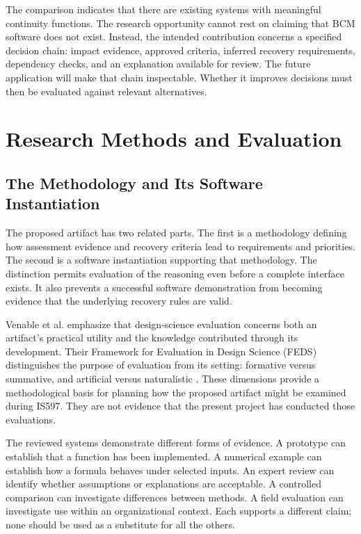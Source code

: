The comparison indicates that there are existing systems with meaningful continuity functions. The research opportunity cannot rest on claiming that BCM software does not exist. Instead, the intended contribution concerns a specified decision chain: impact evidence, approved criteria, inferred recovery requirements, dependency checks, and an explanation available for review. The future application will make that chain inspectable. Whether it improves decisions must then be evaluated against relevant alternatives.

\section{Research Methods and Evaluation}

\subsection{The Methodology and Its Software Instantiation}

The proposed artifact has two related parts. The first is a methodology defining how assessment evidence and recovery criteria lead to requirements and priorities. The second is a software instantiation supporting that methodology. The distinction permits evaluation of the reasoning even before a complete interface exists. It also prevents a successful software demonstration from becoming evidence that the underlying recovery rules are valid.

Venable et al. emphasize that design-science evaluation concerns both an artifact's practical utility and the knowledge contributed through its development. Their Framework for Evaluation in Design Science (FEDS) distinguishes the purpose of evaluation from its setting: formative versus summative, and artificial versus naturalistic \cite{venable2016feds}. These dimensions provide a methodological basis for planning how the proposed artifact might be examined during IS597. They are not evidence that the present project has conducted those evaluations.

The reviewed systems demonstrate different forms of evidence. A prototype can establish that a function has been implemented. A numerical example can establish how a formula behaves under selected inputs. An expert review can identify whether assumptions or explanations are acceptable. A controlled comparison can investigate differences between methods. A field evaluation can investigate use within an organizational context. Each supports a different claim; none should be used as a substitute for all the others.

